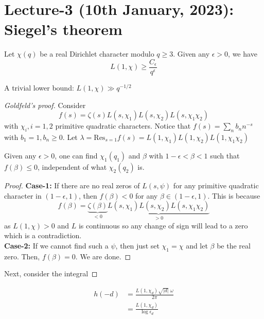 \documentclass[oneside, 12pt]{scrbook}
\theoremstyle{theorem}
\begin{document}
\chapter{Lecture-3 (10th January, 2023): Siegel's theorem }

\begin{theorem}[Siegel]
Let $\chi(q)$ be a real Dirichlet character modulo $q\geq 3$. Given any $\epsilon >0$, we have $$L(1, \chi) \geq \frac{C_{\epsilon}}{q^{\epsilon}}$$
\end{theorem}

A trivial lower bound: $L(1, \chi) \gg q^{-1/2}$

\begin{proof}[Goldfeld's proof]
Consider $$f(s) = \zeta(s)L(s,\chi_{1})L(s,\chi_{2})L(s,\chi_{1}\chi_{2})$$ with $\chi_{i}, i=1,2$ primitive quadratic characters. Notice that $f(s) = \sum_{n} b_{n}n^{-s}$ with $b_{1} =1 , b_{n} \geq 0$. Let $\lambda = \mathrm{Res}_{s=1}f(s) = L(1,\chi_{1})L(1,\chi_{2})L(1,\chi_{1}\chi_{2})$

\begin{lemma}
Given any $\epsilon >0$, one can find $\chi_{1}(q_{1})$ and $\beta$ with $1-\epsilon < \beta < 1$ such that $f(\beta) \le 0$, independent of what $\chi_{2}(q_{2})$ is. 
\end{lemma}

\begin{proof}
\textbf{Case-1:} If there are no real zeros of $L(s, \psi)$ for any primitive quadratic character in $(1-\epsilon,1)$, then $f(\beta) < 0$ for any $\beta \in (1 - \epsilon,1)$. This is because $$f(\beta) = \underbrace{\zeta(\beta)}_{<0} \underbrace{L(s,\chi_{1})L(s,\chi_{2})L(s,\chi_{1}\chi_{2})}_{>0}$$ as $L(1,\chi)>0$ and $L$ is continuous so any change of sign will lead to a zero which is a contradiction. \\
\textbf{Case-2:} If we cannot find such a $\psi$, then just set $\chi_{1}=\chi$ and let $\beta$ be the real zero. Then, $f(\beta)=0$. We are done. 
\end{proof}

Next, consider the integral 

\end{proof}

\begin{corollary}
\begin{align*}
h(-d) &= \frac{L(1,\chi_{d}) \sqrt{|d|} \;\omega}{2 \pi} \\
&= \frac{L(1,\chi_{d})}{\log \epsilon_{d}}
\end{align*}
\end{corollary}
\end{document}
